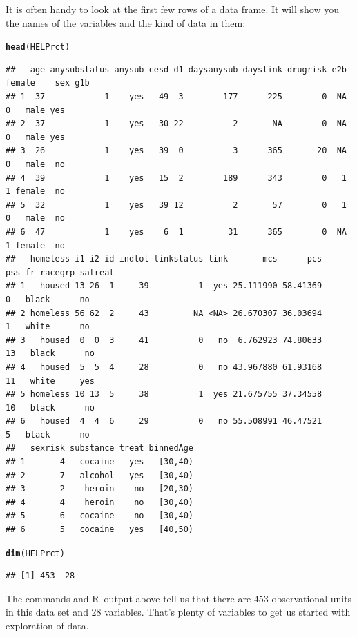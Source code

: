 \documentclass[twoside]{book}\usepackage[]{graphicx}\usepackage[]{xcolor}
\makeatletter
\newcommand{\hlstd}[1]{\textcolor[rgb]{0.345,0.345,0.345}{#1}}%
\newcommand{\hlkwd}[1]{\textcolor[rgb]{0.737,0.353,0.396}{\textbf{#1}}}%
\newenvironment{kframe}{%
 \def\at@end@of@kframe{}%
 \ifinner\ifhmode%
  \def\at@end@of@kframe{\end{minipage}}%
  \begin{minipage}{\columnwidth}%
 \fi\fi%
 \def\FrameCommand##1{\hskip\@totalleftmargin \hskip-\fboxsep
 \colorbox{shadecolor}{##1}\hskip-\fboxsep
     \hskip-\linewidth \hskip-\@totalleftmargin \hskip\columnwidth}%
 \MakeFramed {\advance\hsize-\width
   \@totalleftmargin\z@ \linewidth\hsize
   \@setminipage}}%
 {\par\unskip\endMakeFramed%
 \at@end@of@kframe}
\newenvironment{knitrout}{}{} %
\def\R{{\sf R}}
\makeatother
\begin{document}
It is often handy to look at the first few rows of a data frame.  It will
show you the names of the variables and the kind of data in them:
\begin{knitrout}
\color{fgcolor}\begin{kframe}
\begin{alltt}
\hlkwd{head}\hlstd{(HELPrct)}
\end{alltt}
\begin{verbatim}
##   age anysubstatus anysub cesd d1 daysanysub dayslink drugrisk e2b female    sex g1b
## 1  37            1    yes   49  3        177      225        0  NA      0   male yes
## 2  37            1    yes   30 22          2       NA        0  NA      0   male yes
## 3  26            1    yes   39  0          3      365       20  NA      0   male  no
## 4  39            1    yes   15  2        189      343        0   1      1 female  no
## 5  32            1    yes   39 12          2       57        0   1      0   male  no
## 6  47            1    yes    6  1         31      365        0  NA      1 female  no
##   homeless i1 i2 id indtot linkstatus link       mcs      pcs pss_fr racegrp satreat
## 1   housed 13 26  1     39          1  yes 25.111990 58.41369      0   black      no
## 2 homeless 56 62  2     43         NA <NA> 26.670307 36.03694      1   white      no
## 3   housed  0  0  3     41          0   no  6.762923 74.80633     13   black      no
## 4   housed  5  5  4     28          0   no 43.967880 61.93168     11   white     yes
## 5 homeless 10 13  5     38          1  yes 21.675755 37.34558     10   black      no
## 6   housed  4  4  6     29          0   no 55.508991 46.47521      5   black      no
##   sexrisk substance treat binnedAge
## 1       4   cocaine   yes   [30,40)
## 2       7   alcohol   yes   [30,40)
## 3       2    heroin    no   [20,30)
## 4       4    heroin    no   [30,40)
## 5       6   cocaine    no   [30,40)
## 6       5   cocaine   yes   [40,50)
\end{verbatim}
\begin{alltt}
\hlkwd{dim}\hlstd{(HELPrct)}
\end{alltt}
\begin{verbatim}
## [1] 453  28
\end{verbatim}
\end{kframe}
\end{knitrout}
The commands and \R\ output above tell us that there are 453 observational
units in this data set and 28 variables.
That's plenty of variables to get us started with exploration of data.
\end{document}
